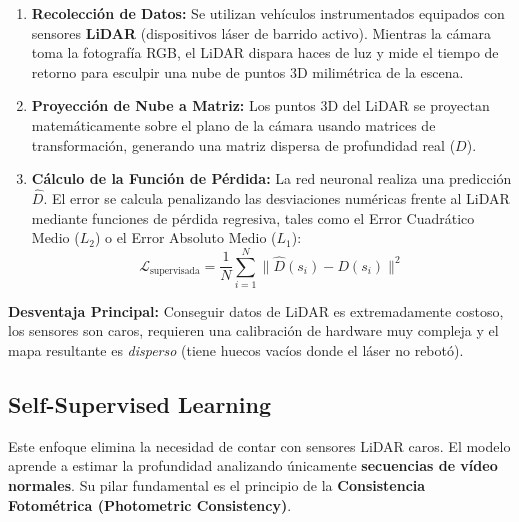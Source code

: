 \begin{enumerate}
    \item \textbf{Recolección de Datos:} Se utilizan vehículos instrumentados equipados con sensores \textbf{LiDAR} (dispositivos láser de barrido activo). Mientras la cámara toma la fotografía RGB, el LiDAR dispara haces de luz y mide el tiempo de retorno para esculpir una nube de puntos $3\text{D}$ milimétrica de la escena.
    \item \textbf{Proyección de Nube a Matriz:} Los puntos $3\text{D}$ del LiDAR se proyectan matemáticamente sobre el plano de la cámara usando matrices de transformación, generando una matriz dispersa de profundidad real ($D$).
    \item \textbf{Cálculo de la Función de Pérdida:} La red neuronal realiza una predicción $\hat{D}$. El error se calcula penalizando las desviaciones numéricas frente al LiDAR mediante funciones de pérdida regresiva, tales como el Error Cuadrático Medio ($L_2$) o el Error Absoluto Medio ($L_1$):
    \begin{equation}
        \mathcal{L}_{\text{supervisada}} = \frac{1}{N} \sum_{i=1}^{N} \|\hat{D}(s_i) - D(s_i)\|^2
    \end{equation}
\end{enumerate}
\textbf{Desventaja Principal:} Conseguir datos de LiDAR es extremadamente costoso, los sensores son caros, requieren una calibración de hardware muy compleja y el mapa resultante es \textit{disperso} (tiene huecos vacíos donde el láser no rebotó).

\subsection{Self-Supervised Learning}
\noindent
Este enfoque elimina la necesidad de contar con sensores LiDAR caros. El modelo aprende a estimar la profundidad analizando únicamente \textbf{secuencias de vídeo normales}. Su pilar fundamental es el principio de la \textbf{Consistencia Fotométrica (Photometric Consistency)}. \\

